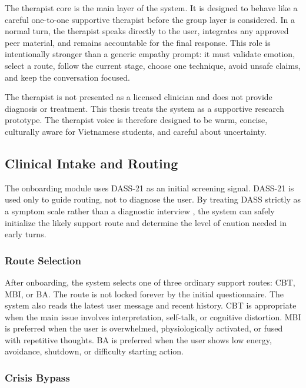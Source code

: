 The therapist core is the main layer of the system. It is designed to behave like a careful one-to-one supportive therapist before the group layer is considered. In a normal turn, the therapist speaks directly to the user, integrates any approved peer material, and remains accountable for the final response. This role is intentionally stronger than a generic empathy prompt: it must validate emotion, select a route, follow the current stage, choose one technique, avoid unsafe claims, and keep the conversation focused.

The therapist is not presented as a licensed clinician and does not provide diagnosis or treatment. This thesis treats the system as a supportive research prototype. The therapist voice is therefore designed to be warm, concise, culturally aware for Vietnamese students, and careful about uncertainty.

\subsection{Clinical Intake and Routing}

The onboarding module uses DASS-21 as an initial screening signal. DASS-21 is used only to guide routing, not to diagnose the user. By treating DASS strictly as a symptom scale rather than a diagnostic interview \citep{Lovibond1995DASS,Le2017DASS21Vietnamese}, the system can safely initialize the likely support route and determine the level of caution needed in early turns.

\subsubsection{Route Selection}

After onboarding, the system selects one of three ordinary support routes: CBT, MBI, or BA. The route is not locked forever by the initial questionnaire. The system also reads the latest user message and recent history. CBT is appropriate when the main issue involves interpretation, self-talk, or cognitive distortion. MBI is preferred when the user is overwhelmed, physiologically activated, or fused with repetitive thoughts. BA is preferred when the user shows low energy, avoidance, shutdown, or difficulty starting action.

\subsubsection{Crisis Bypass}

